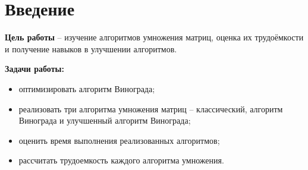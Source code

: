 \chapter*{Введение}

\textbf{Цель работы} – изучение алгоритмов умножения матриц, оценка их трудоёмкости и получение навыков в улучшении алгоритмов.

\textbf{Задачи работы:}
\begin{itemize}
	\item оптимизировать алгоритм Винограда; 
	\item реализовать три алгоритма умножения матриц -- классический, алгоритм Винограда и улучшенный алгоритм Винограда; 
	\item оценить время выполнения реализованных алгоритмов;
	\item рассчитать трудоемкость каждого алгоритма умножения.
\end{itemize}